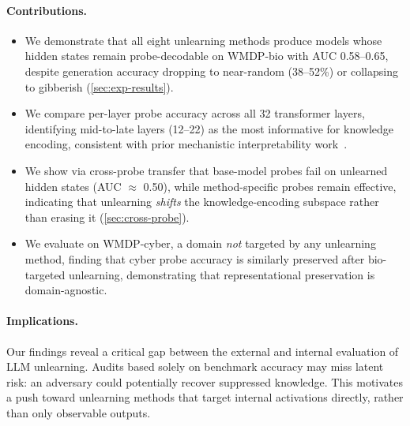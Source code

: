\paragraph{Contributions.}
\begin{itemize}[leftmargin=1.5em, itemsep=2pt]
    \item We demonstrate that all eight unlearning methods produce models whose hidden
    states remain probe-decodable on WMDP-bio with AUC 0.58--0.65, despite generation
    accuracy dropping to near-random (38--52\%) or collapsing to gibberish (\cref{sec:exp-results}).

    \item We compare per-layer probe accuracy across all 32 transformer layers,
    identifying mid-to-late layers (12--22) as the most informative for knowledge encoding,
    consistent with prior mechanistic interpretability work~\citep{meng2022locating}.

    \item We show via cross-probe transfer that base-model probes fail on unlearned hidden
    states (AUC $\approx$ 0.50), while method-specific probes remain effective, indicating
    that unlearning \emph{shifts} the knowledge-encoding subspace rather than erasing it
    (\cref{sec:cross-probe}).

    \item We evaluate on WMDP-cyber, a domain \emph{not} targeted by any unlearning method,
    finding that cyber probe accuracy is similarly preserved after bio-targeted unlearning,
    demonstrating that representational preservation is domain-agnostic.
    
\end{itemize}

\paragraph{Implications.}
Our findings reveal a critical gap between the external and internal evaluation of LLM unlearning.
Audits based solely on benchmark accuracy may miss latent risk: an adversary could potentially recover suppressed knowledge.
This motivates a push toward unlearning methods that target internal activations directly, rather than only observable outputs.
